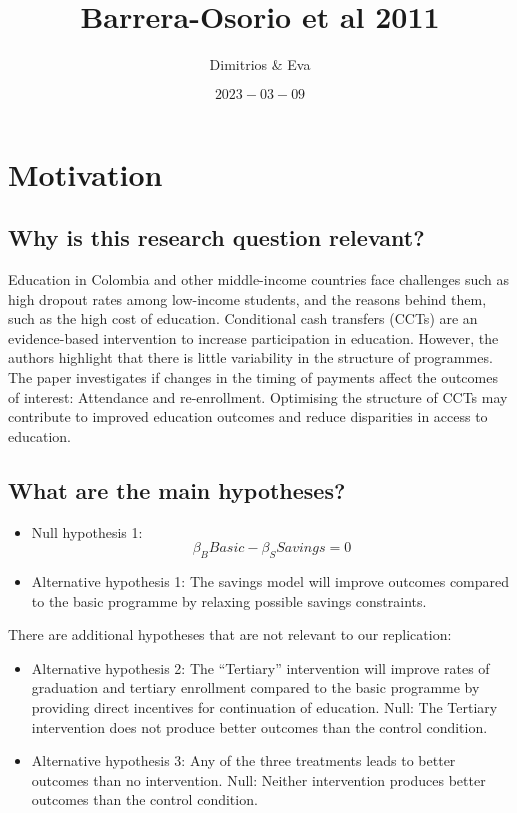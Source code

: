 \documentclass[
]{article}
\title{Barrera-Osorio et al 2011}
\author{Dimitrios \& Eva}
\date{\(2023-03-09\)}
\providecommand{\tightlist}{%
  \setlength{\itemsep}{0pt}\setlength{\parskip}{0pt}}
\begin{document}
\maketitle

{
\setcounter{tocdepth}{2}
\tableofcontents
}
\newpage

\hypertarget{motivation}{%
\section{Motivation}\label{motivation}}

\hypertarget{why-is-this-research-question-relevant}{%
\subsection{Why is this research question
relevant?}\label{why-is-this-research-question-relevant}}

Education in Colombia and other middle-income countries face challenges
such as high dropout rates among low-income students, and the reasons
behind them, such as the high cost of education. Conditional cash
transfers (CCTs) are an evidence-based intervention to increase
participation in education. However, the authors highlight that there is
little variability in the structure of programmes. The paper
investigates if changes in the timing of payments affect the outcomes of
interest: Attendance and re-enrollment. Optimising the structure of CCTs
may contribute to improved education outcomes and reduce disparities in
access to education.

\hypertarget{what-are-the-main-hypotheses}{%
\subsection{What are the main
hypotheses?}\label{what-are-the-main-hypotheses}}

\begin{itemize}
\tightlist
\item
  Null hypothesis 1: \[ \beta_{B} Basic - \beta_{S} Savings = 0 \]
\item
  Alternative hypothesis 1: The savings model will improve outcomes
  compared to the basic programme by relaxing possible savings
  constraints.
\end{itemize}

There are additional hypotheses that are not relevant to our
replication:

\begin{itemize}
\tightlist
\item
  Alternative hypothesis 2: The ``Tertiary'' intervention will improve
  rates of graduation and tertiary enrollment compared to the basic
  programme by providing direct incentives for continuation of
  education. Null: The Tertiary intervention does not produce better
  outcomes than the control condition.
\item
  Alternative hypothesis 3: Any of the three treatments leads to better
  outcomes than no intervention. Null: Neither intervention produces
  better outcomes than the control condition.
\end{itemize}
\end{document}
